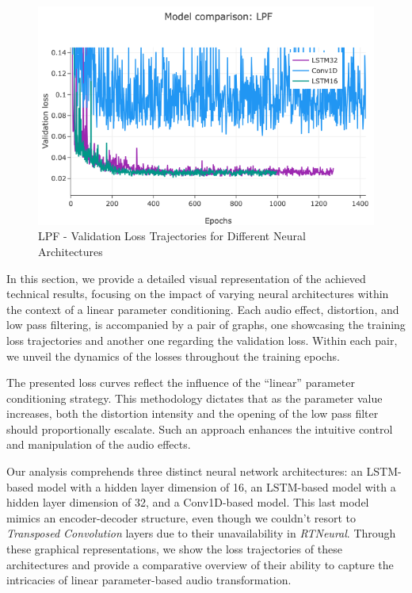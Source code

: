 \documentclass{article}
\newcommand{\quotes}[1]{``#1''}
\begin{document}
\begin{sloppy}
\begin{figure}[t]
  \centering
  \centerline{\includegraphics[width=\columnwidth]{./plots/trimmedImgs/lpf valLoss.png}}
  \caption{LPF - Validation Loss Trajectories for Different Neural Architectures}
  \label{fig:lpfVal}
\end{figure}

In this section, we provide a detailed visual representation of the achieved technical results, focusing on the impact of varying neural architectures within the context of a linear parameter conditioning. Each audio effect, distortion, and low pass filtering, is accompanied by a pair of graphs, one showcasing the training loss trajectories and another one regarding the validation loss. Within each pair, we unveil the dynamics of the losses  throughout the training epochs.

The presented loss curves reflect the influence of the \quotes{linear} parameter conditioning strategy. This methodology dictates that as the parameter value increases, both the distortion intensity and the opening of the low pass filter should proportionally escalate. Such an approach enhances the intuitive control and manipulation of the audio effects.

Our analysis comprehends three distinct neural network architectures: an LSTM-based model with a hidden layer dimension of 16, an LSTM-based model with a hidden layer dimension of 32, and a Conv1D-based model. This last model mimics an encoder-decoder structure, even though we couldn't resort to \emph{Transposed Convolution} layers due to their unavailability in \emph{RTNeural}. Through these graphical representations, we show the loss trajectories of these architectures and provide a comparative overview of their ability to capture the intricacies of linear parameter-based audio transformation.


\end{sloppy}
\end{document}
